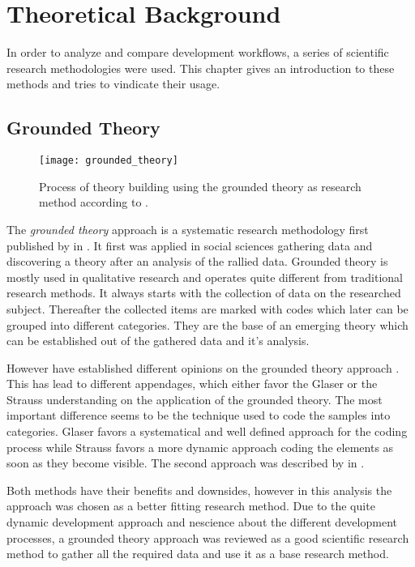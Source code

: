\chapter{Theoretical Background} %
\label{chap:theoretical background}

In order to analyze and compare development workflows, a series of scientific
research methodologies were used. This chapter gives an introduction to these
methods and tries to vindicate their usage.

\section{Grounded Theory} %

\begin{figure}[htbp]
  \centering
  \texttt{[image: grounded\_theory]}
  \caption{Process of theory building using the grounded theory as research
    method according to \citeauthor{Strauss1990} \cite{Pandit1996}.}
\end{figure}

The \emph{grounded theory} approach is a systematic research methodology first
published by \textcite{Glaser1967} in \citeyear{Glaser1967}. It first was
applied in social sciences gathering data and discovering a theory after an
analysis of the rallied data. Grounded theory is mostly used in qualitative
research and operates quite different from traditional research methods. It
always starts with the collection of data on the researched subject. Thereafter
the collected items are marked with codes which later can be grouped into
different categories. They are the base of an emerging theory which can be
established out of the gathered data and it's analysis.

However \citeauthor{Glaser1967} have established different opinions on the
grounded theory approach \cite{Heath2004}. This has lead to different
appendages, which either favor the Glaser or the Strauss understanding on the
application of the grounded theory. The most important difference seems to be
the technique used to code the samples into categories. Glaser favors a
systematical and well defined approach for the coding process while Strauss
favors a more dynamic approach coding the elements as soon as they become
visible. The second approach was described by \textcite{Strauss1990} in
\citeyear{Strauss1990}.

Both methods have their benefits and downsides, however in this analysis the
\citeauthor{Strauss1990} approach was chosen as a better fitting research
method. Due to the quite dynamic development approach and nescience about the
different development processes, a grounded theory approach was reviewed as a
good scientific research method to gather all the required data and use it as a
base research method.

